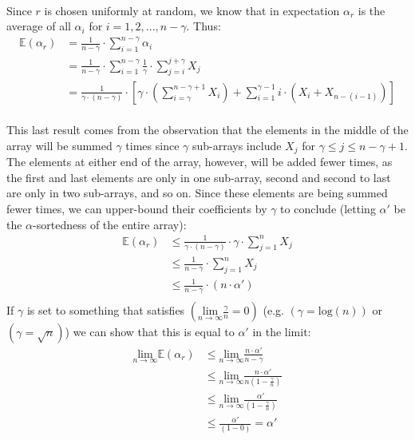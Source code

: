 \documentclass{article}
\begin{document}
\paragraph{}Since $r$ is chosen uniformly at random, we know that in expectation $\alpha_{r}$ is the average of all $\alpha_{i}$ for $i = 1, 2, ..., n - \gamma$. Thus:
\begin{align*}
\mathbb E(\alpha_{r}) &= \frac{1}{n - \gamma} \cdot \sum_{i = 1}^{n - \gamma}\alpha_{i} \\
&= \frac{1}{n - \gamma} \cdot \sum_{i = 1}^{n - \gamma} \frac{1}{\gamma} \cdot \sum_{j = i}^{j + \gamma}X_{j} \\
&= \frac{1}{\gamma \cdot (n - \gamma)} \cdot \left[ \gamma \cdot \left( \sum_{i=\gamma}^{n - \gamma + 1} X_{i} \right) + \sum_{i=1}^{\gamma-1}i\cdot\left(X_{i} + X_{n-(i-1)}\right)\right]
\end{align*}
\paragraph{}This last result comes from the observation that the elements in the middle of the array will be summed $\gamma$ times since $\gamma$ sub-arrays include $X_{j}$ for $\gamma \leq j \leq n - \gamma + 1$.
The elements at either end of the array, however, will be added fewer times, as the first and last elements are only in one sub-array, second and second to last are only in two sub-arrays, and so on.
Since these elements are being summed fewer times, we can upper-bound their coefficients by $\gamma$ to conclude (letting $\alpha'$ be the $\alpha$-sortedness of the entire array):
\begin{align*}
\mathbb E(\alpha_{r}) & \leq \frac{1}{\gamma \cdot (n - \gamma)} \cdot \gamma \cdot \sum_{j = 1}^{n} X_{j} \\
& \leq \frac{1}{n - \gamma} \cdot \sum_{j = 1}^{n} X_{j} \\
& \leq \frac{1}{n - \gamma} \cdot (n \cdot \alpha') \\
\end{align*}
If $\gamma$ is set to something that satisfies $(\underset{n\rightarrow\infty}{\text{lim}}\frac{\gamma}{n} = 0)$ (e.g. $(\gamma = \text{log}(n))$ or $(\gamma = \sqrt n)$) we can show that this is equal to $\alpha'$ in the limit:
\begin{align*}
\underset{n\rightarrow\infty}{\text{lim}}\mathbb E(\alpha_{r})
& \leq \underset{n\rightarrow\infty}{\text{lim}}\frac{n \cdot \alpha'}{n - \gamma} \\
& \leq \underset{n\rightarrow\infty}{\text{lim}}\frac{n \cdot \alpha'}{n(1-\frac{\gamma}{n})} \\
& \leq \underset{n\rightarrow\infty}{\text{lim}}\frac{\alpha'}{(1-\frac{\gamma}{n})} \\
& \leq \frac{\alpha'}{(1-0)} = \alpha'
\end{align*}
\end{document}

